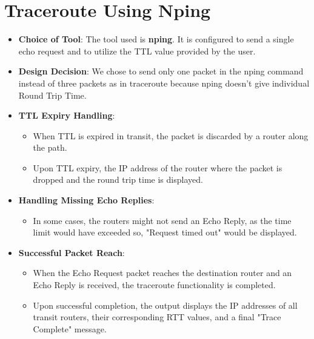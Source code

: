 \documentclass{article}
\begin{document}
\section*{Traceroute Using Nping}
\begin{itemize}
    \item \textbf{Choice of Tool}: The tool used is \textbf{nping}. It is configured to send a single echo request and to utilize the TTL value provided by the user.
    \item \textbf{Design Decision}: We chose to send only one packet in the nping command instead of three packets as in traceroute because nping doesn't give individual Round Trip Time.
    \item \textbf{TTL Expiry Handling}: 
        \begin{itemize}
            \item When TTL is expired in transit, the packet is discarded by a router along the path.
            \item Upon TTL expiry, the IP address of the router where the packet is dropped and the round trip time is displayed.
        \end{itemize}
    \item \textbf{Handling Missing Echo Replies}:
        \begin{itemize}
            \item In some cases, the routers might not send an Echo Reply, as the time limit would have exceeded so, "Request timed out" would be displayed.
        \end{itemize}
    \item \textbf{Successful Packet Reach}:
        \begin{itemize}
            \item When the Echo Request packet reaches the destination router and an Echo Reply is received, the traceroute functionality is completed.
            \item Upon successful completion, the output displays the IP addresses of all transit routers, their corresponding RTT values, and a final "Trace Complete" message.
        \end{itemize}
\end{itemize}
\end{document}
